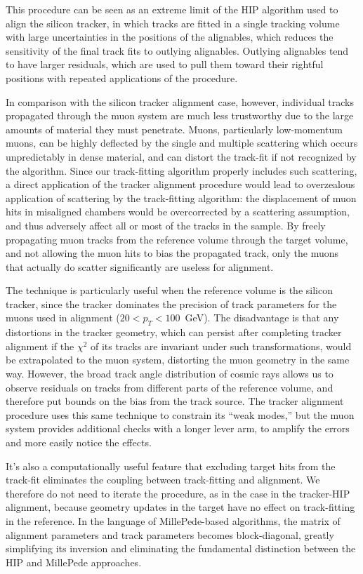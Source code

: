 \documentclass[12pt]{article}
\begin{document}
This procedure can be seen as an extreme limit of the HIP algorithm
used to align the silicon tracker, in which tracks are fitted in a
single tracking volume with large uncertainties in the positions of
the alignables, which reduces the sensitivity of the final track fits
to outlying alignables.  Outlying alignables tend to have larger
residuals, which are used to pull them toward their rightful positions
with repeated applications of the procedure.

In comparison with the silicon tracker alignment case, however,
individual tracks propagated through the muon system are much less
trustworthy due to the large amounts of material they must penetrate.
Muons, particularly low-momentum muons, can be highly deflected by the
single and multiple scattering which occurs unpredictably in dense
material, and can distort the track-fit if not recognized by the
algorithm.  Since our track-fitting algorithm properly includes such
scattering, a direct application of the tracker alignment procedure
would lead to overzealous application of scattering by the
track-fitting algorithm: the displacement of muon hits in misaligned
chambers would be overcorrected by a scattering assumption, and thus
adversely affect all or most of the tracks in the sample.  By freely
propagating muon tracks from the reference volume through the target
volume, and not allowing the muon hits to bias the propagated track,
only the muons that actually do scatter significantly are useless for
alignment.

The technique is particularly useful when the reference volume is the
silicon tracker, since the tracker dominates the precision of track
parameters for the muons used in alignment ($20 < p_T < 100$~GeV).
The disadvantage is that any distortions in the tracker geometry,
which can persist after completing tracker alignment if the $\chi^2$
of its tracks are invariant under such transformations, would be
extrapolated to the muon system, distorting the muon geometry in the
same way.  However, the broad track angle distribution of cosmic rays
allows us to observe residuals on tracks from different parts of the
reference volume, and therefore put bounds on the bias from the track
source.  The tracker alignment procedure uses this same technique to
constrain its ``weak modes,'' but the muon system provides additional
checks with a longer lever arm, to amplify the errors and more easily
notice the effects.

It's also a computationally useful feature that excluding target hits
from the track-fit eliminates the coupling between track-fitting and
alignment.  We therefore do not need to iterate the procedure, as in
the case in the tracker-HIP alignment, because geometry updates in the
target have no effect on track-fitting in the reference.  In the
language of MillePede-based algorithms, the matrix of alignment
parameters and track parameters becomes block-diagonal, greatly
simplifying its inversion and eliminating the fundamental distinction
between the HIP and MillePede approaches.
\end{document}
